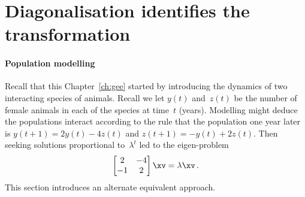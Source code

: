 

\section{Diagonalisation identifies the transformation}
\label{sec:dit}
\secttoc
\begin{comment}
\pooliv{\S4.4} \layiv{\S5.3} \holti{\S6.4} \cite[\S09]{Davis99a}
\end{comment}


\paragraph{Population modelling} 
Recall that this Chapter~\ref{ch:gee} started by introducing the dynamics of two interacting species of animals.
Recall we let \(y(t)\) and~\(z(t)\) be the number of female animals in each of the species at time~\(t\) (years). 
Modelling might deduce the populations interact according to the rule that the population one year later is \(y(t+1)=2y(t)-4z(t)\) and \(z(t+1)=-y(t)+2z(t)\).
Then seeking solutions proportional to~\(\lambda^t\) led to the eigen-problem
\begin{equation*}
\begin{bmatrix} 2&-4\\-1&2 \end{bmatrix}\xv=\lambda\xv\,.
\end{equation*}
This section introduces an alternate equivalent approach.

